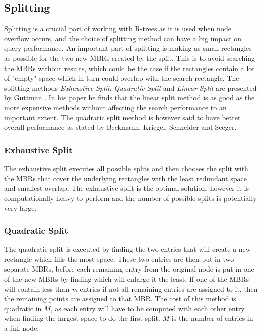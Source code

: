 \subsection{Splitting}
Splitting is a crucial part of working with R-trees as it is used when node overflow occurs, and the choice of splitting method can have a big impact on query performance. An important part of splitting is making as small rectangles as possible for the two new MBRs created by the split. This is to avoid searching the MBRs without results, which could be the case if the rectangles contain a lot of "empty" space which in turn could overlap with the search rectangle. The splitting methods \emph{Exhaustive Split}, \emph{Quadratic Split} and \emph{Linear Split} are presented by Guttman \cite{r-tree}. In his paper he finds that the linear split method is as good as the more expensive methods without affecting the search performance to an important extent. The quadratic split method is however said to have better overall performance as stated by Beckmann, Kriegel, Schneider and Seeger\cite{R*-tree}.

\subsubsection{Exhaustive Split}
The exhaustive split executes all possible splits and then chooses the split with the MBRs that cover the underlying rectangles with the least redundant space and smallest overlap. The exhaustive split is the optimal solution, however it is computationally heavy to perform and the number of possible splits is potentially very large.

\subsubsection{Quadratic Split}
The quadratic split is executed by finding the two entries that will create a new rectangle which fills the most space. These two entries are then put in two separate MBRs, before each remaining entry from the original node is put in one of the new MBRs by finding which will enlarge it the least. If one of the MBRs will contain less than \emph{m} entries if not all remaining entries are assigned to it, then the remaining points are assigned to that MBR. The cost of this method is quadratic in $M$, as each entry will have to be computed with each other entry when finding the largest space to do the first split. $M$ is the number of entries in a full node. 

